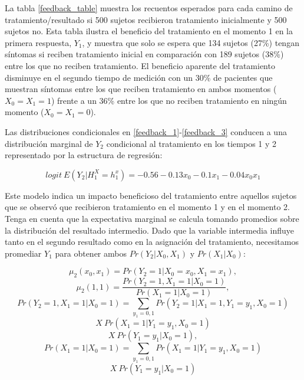 \documentclass[spanish]{article}
\numberwithin{figure}{subsection}
\numberwithin{equation}{subsection}
\numberwithin{table}{subsection}
\begin{document}
La tabla \ref{feedback_table} muestra los recuentos esperados para cada camino
de tratamiento/resultado si 500 sujetos recibieron tratamiento inicialmente y
500 sujetos no. Esta tabla ilustra el beneficio del tratamiento en el momento 1
en la primera respuesta, $Y_1$, y muestra que solo se espera que 134 sujetos
(27\%) tengan síntomas si reciben tratamiento inicial en comparación con 189
sujetos (38\%) entre los que no reciben tratamiento. El beneficio aparente del
tratamiento disminuye en el segundo tiempo de medición con un 30\% de pacientes
que muestran síntomas entre los que reciben tratamiento en ambos momentos
($X_0 = X_1 = 1$) frente a un 36\% entre los que no reciben tratamiento en
ningún momento ($X_0 = X_1 = 0$).

Las distribuciones condicionales en \ref{feedback_1}-\ref{feedback_3} conducen
a una distribución marginal de $Y_2$ condicional al tratamiento en los tiempos
1 y 2 representado por la estructura de regresión:

\begin{equation}
	\label{feedback_4}
	logit \ E(Y_2|H_1^X = h_1^x) = -0.56 - 0.13x_0 -0.1x_1 - 0.04x_0x_1
\end{equation}

Este modelo indica un impacto beneficioso del tratamiento entre aquellos
sujetos que se observó que recibieron tratamiento en el momento 1 y en el
momento 2. Tenga en cuenta que la expectativa marginal se calcula tomando
promedios sobre la distribución del resultado intermedio. Dado que la variable
intermedia influye tanto en el segundo resultado como en la asignación del
tratamiento, necesitamos promediar $Y_1$ para obtener ambos $Pr(Y_2|X_0, X_1)$
y $Pr(X_1|X_0)$:

\[ \mu_2(x_0, x_1) = Pr(Y_2 = 1|X_0 = x_0, X_1 = x_1), \]
\[\mu_2(1, 1) = \frac{Pr(Y_2 = 1, X_1 = 1 | X_0 = 1)}{Pr(X_1 = 1 | X_0 = 1)},\]
\[ Pr(Y_2 = 1, X_1 = 1 | X_0 = 1) = \sum_{y_1 = 0, 1}
Pr(Y_2 = 1 | X_1 = 1, Y_1 = y_1, X_0 = 1) \]
\[ X \ Pr(X_1 = 1 | Y_1 = y_1, X_0 = 1) \]
\[ X \ Pr(Y_1 = y_1 | X_0 = 1), \]
\[ Pr(X_1 = 1 | X_0 = 1) = \sum_{y_1 = 0, 1} Pr(X_1 = 1 | Y_1 = y_1, X_0 = 1)\]
\[ X \ Pr(Y_1 = y_1 | X_0 = 1) \]
\end{document}

